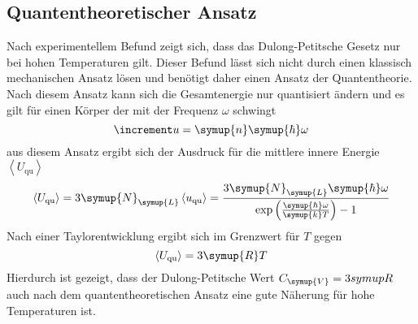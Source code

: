 \subsection{Quantentheoretischer Ansatz}
Nach experimentellem Befund zeigt sich, dass das Dulong-Petitsche Gesetz
nur bei hohen Temperaturen gilt. Dieser Befund lässt sich nicht durch
einen klassisch mechanischen Ansatz lösen und benötigt daher einen
Ansatz der Quantentheorie. Nach diesem Ansatz kann sich die Gesamtenergie
nur quantisiert ändern und es gilt für einen Körper der mit der Frequenz
$\omega$ schwingt
\begin{equation}
  \increment u = \symup{n}\symup{\hbar}\omega
\end{equation}
aus diesem Ansatz ergibt sich der Ausdruck für die mittlere innere Energie
$\left<U_\text{qu}\right>$
\begin{equation}
  \left<U_\text{qu}\right> = 3\symup{N}_\symup{L}\left<u_\text{qu}\right>
  = \frac{3\symup{N}_\symup{L}\symup{\hbar}\omega}
  {\exp\left(\frac{\symup{\hbar}\omega}{\symup{k}T}\right)-1}
\end{equation}
Nach einer Taylorentwicklung ergibt sich im Grenzwert für $T$ gegen
\infty
\begin{equation}
  \left<U_\text{qu}\right> = 3\symup{R}T
\end{equation}
Hierdurch ist gezeigt, dass der Dulong-Petitsche Wert $C_\symup{V}=3symup{R}$
auch nach dem quantentheoretischen Ansatz eine gute Näherung für
hohe Temperaturen ist.

